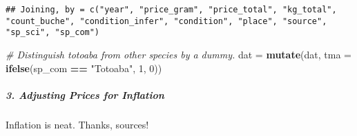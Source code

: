 \documentclass[]{article}
\newenvironment{Shaded}{\begin{snugshade}}{\end{snugshade}}
\newcommand{\KeywordTok}[1]{\textcolor[rgb]{0.13,0.29,0.53}{\textbf{#1}}}
\newcommand{\DataTypeTok}[1]{\textcolor[rgb]{0.13,0.29,0.53}{#1}}
\newcommand{\DecValTok}[1]{\textcolor[rgb]{0.00,0.00,0.81}{#1}}
\newcommand{\StringTok}[1]{\textcolor[rgb]{0.31,0.60,0.02}{#1}}
\newcommand{\CommentTok}[1]{\textcolor[rgb]{0.56,0.35,0.01}{\textit{#1}}}
\newcommand{\OperatorTok}[1]{\textcolor[rgb]{0.81,0.36,0.00}{\textbf{#1}}}
\newcommand{\NormalTok}[1]{#1}
\let\oldsubparagraph\subparagraph
\renewcommand{\subparagraph}[1]{\oldsubparagraph{#1}\mbox{}}
\begin{document}
\begin{Shaded}
\end{Shaded}

\begin{verbatim}
## Joining, by = c("year", "price_gram", "price_total", "kg_total", "count_buche", "condition_infer", "condition", "place", "source", "sp_sci", "sp_com")
\end{verbatim}

\begin{Shaded}
\begin{Highlighting}[]
\CommentTok{# Distinguish totoaba from other species by a dummy.}
\NormalTok{dat =}\StringTok{ }\KeywordTok{mutate}\NormalTok{(dat, }\DataTypeTok{tma =} \KeywordTok{ifelse}\NormalTok{(sp_com }\OperatorTok{==}\StringTok{ "Totoaba"}\NormalTok{, }\DecValTok{1}\NormalTok{, }\DecValTok{0}\NormalTok{))}
\end{Highlighting}
\end{Shaded}

\subparagraph{3. Adjusting Prices for
Inflation}\label{adjusting-prices-for-inflation}

Inflation is neat. Thanks, sources!
\end{document}
